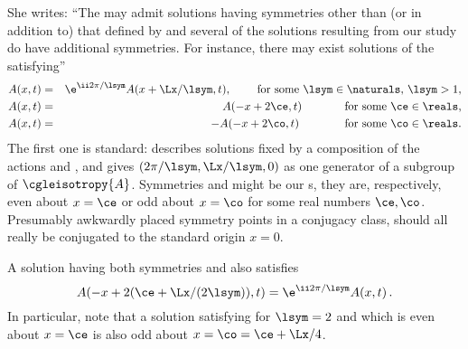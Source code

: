 \begin{description}
{She writes: ``The {\cGLe} may admit solutions having symmetries other than (or
in addition to) that defined by  and
several of the solutions resulting from our study do have additional
symmetries.
For instance, there may exist solutions of the {\cGLe} satisfying''
\begin{eqnarray}
     A(x,t)  & = &   \e^{\ii 2\pi / \lsym} A(x + \Lx / \lsym, t),     \hspace{2.25em} \mbox{for some $\lsym \in \naturals$, $\lsym > 1$,}
                       \label{additionalsym1}  \\
     A(x, t)  & = &   \hspace*{1em}A(-x + 2\ce, t)          \hspace{3.75em} \mbox{for some $\ce \in \reals$,}
                       \label{additionalsym2}  \\
     A(x, t)  & = &   -A(-x + 2\co, t)                                  \hspace{4.00em} \mbox{for some $\co \in \reals$.}
                       \label{additionalsym3}
\end{eqnarray}
The first one is standard:
 describes solutions fixed by a composition of
the actions  and , and gives $(2\pi / \lsym,
\Lx / \lsym, 0)$ as one generator of a subgroup of $\cgleisotropy{A}$.
Symmetries  and  might be our
\ppo s, they are, respectively, even about $x = \ce$ or odd
about $x = \co$ for some real numbers $\ce, \co$.  Presumably awkwardly placed
symmetry points in a conjugacy class, should all really be conjugated to the
standard origin $x=0$.

A solution having both symmetries  and
 also satisfies
\begin{equation}    \label{eqn:lsym_even}
    A(-x + 2(\ce + \Lx/(2\lsym)), t)  = \e^{\ii 2\pi / \lsym} A(x, t) \, .
\end{equation}
In particular, note that a solution satisfying  for
$\lsym = 2$ and which is even about $x = \ce$ is also odd about
$x =\co=\ce+\Lx/4$.

}
\end{description}
